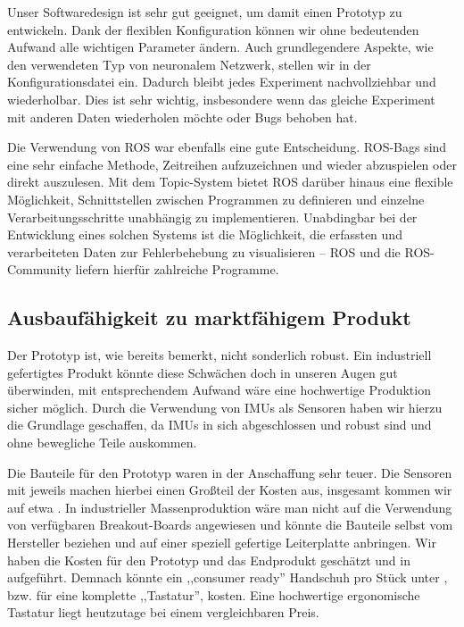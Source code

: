 Unser Softwaredesign ist sehr gut geeignet, um damit einen Prototyp zu
entwickeln. Dank der flexiblen Konfiguration können wir ohne bedeutenden
Aufwand alle wichtigen Parameter ändern. Auch grundlegendere Aspekte, wie den
verwendeten Typ von neuronalem Netzwerk, stellen wir in der Konfigurationsdatei
ein. Dadurch bleibt jedes Experiment nachvollziehbar und wiederholbar. Dies ist
sehr wichtig, insbesondere wenn das gleiche Experiment mit anderen Daten
wiederholen möchte oder Bugs behoben hat.

Die Verwendung von ROS war ebenfalls eine gute Entscheidung. ROS-Bags sind eine
sehr einfache Methode, Zeitreihen aufzuzeichnen und wieder abzuspielen oder
direkt auszulesen. Mit dem Topic-System bietet ROS darüber hinaus eine flexible
Möglichkeit, Schnittstellen zwischen Programmen zu definieren und einzelne
Verarbeitungsschritte unabhängig zu implementieren. Unabdingbar bei der
Entwicklung eines solchen Systems ist die Möglichkeit, die erfassten und
verarbeiteten Daten zur Fehlerbehebung zu visualisieren -- ROS und die
ROS-Community liefern hierfür zahlreiche Programme.

\subsection{Ausbaufähigkeit zu marktfähigem Produkt}

Der Prototyp ist, wie bereits bemerkt, nicht sonderlich robust. Ein industriell
gefertigtes Produkt könnte diese Schwächen doch in unseren Augen gut
überwinden, mit entsprechendem Aufwand wäre eine hochwertige Produktion sicher
möglich. Durch die Verwendung von IMUs als Sensoren haben wir hierzu die
Grundlage geschaffen, da IMUs in sich abgeschlossen und robust sind und ohne
bewegliche Teile auskommen.

Die Bauteile für den Prototyp waren in der Anschaffung sehr teuer. Die
Sensoren mit jeweils  machen hierbei einen Großteil der Kosten aus,
insgesamt kommen wir auf etwa . In industrieller Massenproduktion wäre
man nicht auf die Verwendung von verfügbaren Breakout-Boards angewiesen und
könnte die Bauteile selbst vom Hersteller beziehen und auf einer speziell
gefertige Leiterplatte anbringen. Wir haben die Kosten für den Prototyp und
das Endprodukt geschätzt und in  aufgeführt.  Demnach könnte ein
,,consumer ready'' Handschuh pro Stück unter , bzw.  für eine
komplette ,,Tastatur'', kosten. Eine hochwertige ergonomische Tastatur liegt
heutzutage bei einem vergleichbaren Preis.


